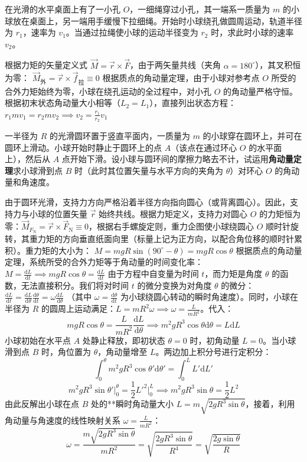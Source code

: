 \begin{exercise}
在光滑的水平桌面上有了一小孔 $O$，一细绳穿过小孔，其一端系一质量为 $m$ 的小球放在桌面上，另一端用手缓慢下拉细绳。开始时小球绕孔做圆周运动，轨道半径为 $r_1$，速率为 $v_1$。当通过拉绳使小球的运动半径变为 $r_2$ 时，求此时小球的速率 $v_2$。
\end{exercise}
\begin{solution}
根据力矩的矢量定义式 $\vec{M} = \vec{r} \times \vec{F}$，由于两矢量共线（夹角 $\alpha = 180^\circ$），其叉积恒为零：
 \(\vec{M}_{\text{外}} = \vec{r} \times \vec{f}_{\text{拉}} \equiv 0\) 根据质点的角动量定理，由于小球对参考点 $O$ 所受的合外力矩始终为零，小球在绕孔运动的全过程中，对小孔 $O$ 的角动量严格守恒。根据初末状态角动量大小相等（$L_2 = L_1$），直接列出状态方程：
 \(r_1 m v_1 = r_2 m v_2 \implies \boxed{v_2 = \frac{r_1}{r_2} v_1}\) 
\end{solution}

\begin{exercise}
一半径为 $R$ 的光滑圆环置于竖直平面内，一质量为 $m$ 的小球穿在圆环上，并可在圆环上滑动。小球开始时静止于圆环上的点 $A$（该点在通过环心 $O$ 的水平面上），然后从 $A$ 点开始下滑。设小球与圆环间的摩擦力略去不计，试运用\textbf{角动量定理}求小球滑到点 $B$ 时（此时其位置矢量与水平方向的夹角为 $\theta$）对环心 $O$ 的角动量和角速度。
\end{exercise}
\begin{solution}
由于圆环光滑，支持力方向严格沿着半径方向指向圆心（或背离圆心）。因此，支持力与小球的位置矢量 $\vec{r}$ 始终共线。根据力矩定义，支持力对圆心 $O$ 的力矩恒为零：$\vec{M}_{F_{\text{N}}} = \vec{r} \times \vec{F}_{\text{N}} \equiv 0$，根据右手螺旋定则，重力企图使小球绕圆心 $O$ 顺时针旋转，其重力矩的方向垂直纸面向里（标量上记为正方向，以配合角位移的顺时针累积）。重力矩的大小为：
 \(M = mgR\sin(90^\circ - \theta) = mgR\cos\theta\) 根据质点的角动量定理，系统所受的合外力矩等于角动量的时间变化率：
 \(M = \frac{\mathrm{d}L}{\mathrm{d}t} \implies mgR\cos\theta = \frac{\mathrm{d}L}{\mathrm{d}t}\) 
由于方程中自变量为时间 $t$，而力矩是角度 $\theta$ 的函数，无法直接积分。我们将对时间 $t$ 的微分变换为对角度 $\theta$ 的微分：
 \(\frac{\mathrm{d}L}{\mathrm{d}t} = \frac{\mathrm{d}L}{\mathrm{d}\theta} \frac{\mathrm{d}\theta}{\mathrm{d}t} = \omega \frac{\mathrm{d}L}{\mathrm{d}\theta}\) 
（其中 $\omega = \frac{\mathrm{d}\theta}{\mathrm{d}t}$ 为小球绕圆心转动的瞬时角速度）。同时，小球在半径为 $R$ 的圆周上运动满足：$L = mR^2\omega \implies \omega = \frac{L}{mR^2}$。代入：
\[
mgR\cos\theta = \frac{L}{mR^2} \frac{\mathrm{d}L}{\mathrm{d}\theta} \implies m^2gR^3\cos\theta\mathrm{d}\theta = L\mathrm{d}L
\]小球初始在水平点 $A$ 处静止释放，即初状态 $\theta = 0$ 时，初角动量 $L = 0$。当小球滑到点 $B$ 时，角位置为 $\theta$，角动量增至 $L$。两边加上积分号进行定积分：
\[
\int_{0}^{\theta} m^2gR^3\cos\theta' \mathrm{d}\theta' = \int_{0}^{L} L'\mathrm{d}L'
\]
\[
m^2gR^3\sin\theta' \Big|_0^\theta = \frac{1}{2}L'^2 \Big|_0^L \implies m^2gR^3\sin\theta = \frac{1}{2}L^2
\]
由此反解出小球在点 $B$ 处的**瞬时角动量大小 $L= m\sqrt{2gR^3\sin\theta}$，接着，利用角动量与角速度的线性映射关系 $\omega = \frac{L}{mR^2}$：
\[
\omega = \frac{m\sqrt{2gR^3\sin\theta}}{mR^2} = \sqrt{\frac{2gR^3\sin\theta}{R^4}} = \boxed{\sqrt{\frac{2g\sin\theta}{R}}}
\]
\end{solution}

